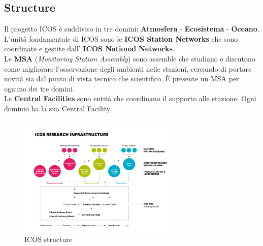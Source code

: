 \subsection{Structure}

Il progetto ICOS è suddiviso in tre domini: \textbf{Atmosfera} - \textbf{Ecosistema} - \textbf{Oceano}. \\

L'unità fondamentale di ICOS sono le \textbf{ICOS Station Networks} che sono coordinate e gestite dall'
\textbf{ICOS National Networks}. \\

Le \textbf{MSA} (\textit{Monitoring Station Assembly}) sono assemble che studiano e discutono come migliorare
l'osservazione degli ambienti nelle stazioni, cercando di portare novità sia dal punto di vista tecnico che scientifico.
È presente un MSA per ognuno dei tre domini. \\

Le \textbf{Central Facilities} sono entità che coordinano il supporto alle stazione. Ogni dominio ha la sua Central Facility. \\

\begin{figure}[h!]
    \caption{ICOS structure}
    \centering
    \includegraphics[width=0.7\textwidth]{figures/icos-structure.jpg}
\end{figure}